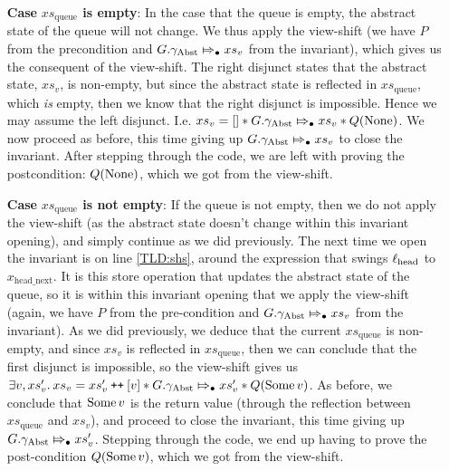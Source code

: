 \documentclass[a4paper, 10pt]{report}
\theoremstyle{definition}
\newcommand{\xsqueue}{xs_{\mathrm{queue}}}
\newcommand{\locN}[1]{\loc_{\mathrm{#1}}}
\newcommand{\lochead}{\locN{head}}
\newcommand{\node}{x}
\newcommand{\nodeN}[1]{\node_{\mathrm{#1}}}
\newcommand{\nodeheadnext}{\nodeN{head\_next}}
\newcommand{\absvalue}{\val}
\newcommand{\absvalueList}{xs_v}
\newcommand{\Qg}{G}
\newcommand{\gabst}{\gname_{\mathrm{Abst}}}
\newcommand\catenate{\mathbin{\text{\ttfamily\upshape ++}}}
\newcommand{\abstractstateauth}[2]{#1 \Mapsto_{\bullet} #2}
\begin{document}
\begin{itemize}
  \item[\textbf{Case}] \textbf{$\xsqueue$ is empty}:
  In the case that the queue is empty, the abstract state of the queue will not change. We thus apply the view-shift (we have $P$ from the precondition and $\abstractstateauth{\Qg.\gabst}{\absvalueList}$ from the invariant), which gives us the consequent of the view-shift. The right disjunct states that the abstract state, $\absvalueList$, is non-empty, but since the abstract state is reflected in $\xsqueue$, which \emph{is} empty, then we know that the right disjunct is impossible. Hence we may assume the left disjunct. I.e. $\absvalueList = [] \star{} \abstractstateauth{\Qg.\gabst}{\absvalueList} \star{} Q(\None)$. We now proceed as before, this time giving up $\abstractstateauth{\Qg.\gabst}{\absvalueList}$ to close the invariant. After stepping through the code, we are left with proving the postcondition: $Q(\operatorname{None})$, which we got from the view-shift.

  \item[\textbf{Case}] \textbf{$\xsqueue$ is not empty}:
  If the queue is not empty, then we do not apply the view-shift (as the abstract state doesn't change within this invariant opening), and simply continue as we did previously. The next time we open the invariant is on line \ref{TLD:shs}, around the expression that swings $\lochead$ to $\nodeheadnext$. It is this store operation that updates the abstract state of the queue, so it is within this invariant opening that we apply the view-shift (again, we have $P$ from the pre-condition and $\abstractstateauth{\Qg.\gabst}{\absvalueList}$ from the invariant). As we did previously, we deduce that the current $\xsqueue$ is non-empty, and since $\absvalueList$ is reflected in $\xsqueue$, then we can conclude that the first disjunct is impossible, so the view-shift gives us $\Exists \absvalue, \absvalueList' . \absvalueList = \absvalueList' \catenate [\absvalue] \star{} \abstractstateauth{\Qg.\gabst}{\absvalueList'} \star{} Q(\Some{\absvalue})$. As before, we conclude that $\Some{\absvalue}$ is the return value (through the reflection between $\xsqueue$ and $\absvalueList$), and proceed to close the invariant, this time giving up $\abstractstateauth{\Qg.\gabst}{\absvalueList'}$. Stepping through the code, we end up having to prove the post-condition $Q(\Some{\absvalue})$, which we got from the view-shift.
\end{itemize}

\end{document}
